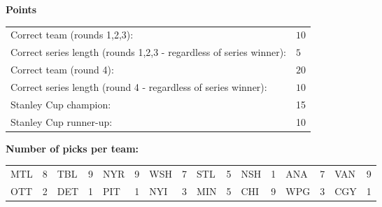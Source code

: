 \documentclass[10pt]{article}
\begin{document}
{\bf Points}\\
\begin{minipage}{12cm}
    \begin{tabular}{l l}
        Correct team (rounds 1,2,3):	& $10$\\
        Correct series length (rounds 1,2,3 - regardless of series winner):	& $5$\\
        Correct team (round 4):	& $20$\\
        Correct series length (round 4 - regardless of series winner):	& $10$\\
        Stanley Cup champion:	& 15\\
        Stanley Cup runner-up:	& 10\\
    \end{tabular}

    \vspace{1cm}
    {\bf Number of picks per team:}\\
    \begin{tabular}{lc | lc | lc | lc | lc | lc | lc | lc }
        MTL & 8 & TBL & 9 & NYR & 9 & WSH & 7 & STL & 5 & NSH & 1 & ANA & 7 & VAN & 9 \\
        OTT & 2 & DET & 1 & PIT & 1 & NYI & 3 & MIN & 5 & CHI & 9 & WPG & 3 & CGY & 1 \\
    \end{tabular}
\end{minipage}
\end{document}
